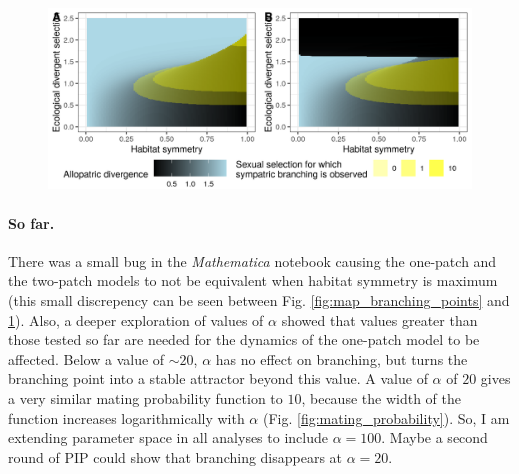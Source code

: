 \begin{figure}
    \centering
    \includegraphics[width=\textwidth]{figures/divergence_across_patches}
     \label{fig:map_divergence}
\end{figure}

\paragraph{So far.} There was a small bug in the \textit{Mathematica} notebook causing the one-patch and the two-patch models to not be equivalent when habitat symmetry is maximum (this small discrepency can be seen between Fig. \ref{fig:map_branching_points}
 and \ref{fig:map_divergence}). Also, a deeper exploration of values of $\alpha$ showed that values greater than those tested so far are needed for the dynamics of the one-patch model to be affected. Below a value of $\sim 20$, $\alpha$ has no effect on branching, but turns the branching point into a stable attractor beyond this value. A value of $\alpha$ of $20$ gives a very similar mating probability function to $10$, because the width of the function increases logarithmically with $\alpha$ (Fig. \ref{fig:mating_probability}). So, I am extending parameter space in all analyses to include $\alpha = 100$. Maybe a second round of PIP could show that branching disappears at $\alpha = 20$.